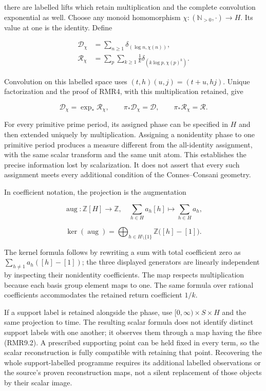 there are labelled lifts which retain multiplication and the complete
convolution exponential as well. Choose any monoid homomorphism
\(\chi:(\mathbb N_{>0},\cdot)\to H\). Its value at one is the identity.
Define

\[
\begin{aligned}
\mathcal D_\chi&=\sum_{n\ge1}\delta_{(\log n,\chi(n))},\\
\mathcal R_\chi&=\sum_p\sum_{k\ge1}\frac1k
\delta_{(k\log p,\chi(p)^k)}.
\end{aligned}
\tag{RMR9.3}
\]

Convolution on this labelled space uses \((t,h)(u,j)=(t+u,hj)\). Unique
factorization and the proof of RMR4, with this multiplication retained,
give

\[
\mathcal D_\chi=\exp_*\mathcal R_\chi,
\qquad
\pi_*\mathcal D_\chi=\mathcal D,
\qquad
\pi_*\mathcal R_\chi=\mathcal R.
\tag{RMR9.4}
\]

For every primitive prime period, its assigned phase can be specified in
\(H\) and then extended uniquely by multiplication. Assigning a
nonidentity phase to one primitive period produces a measure different
from the all-identity assignment, with the same scalar transform and the
same unit atom. This establishes the precise information lost by
scalarization. It does not assert that every such assignment meets every
additional condition of the Connes--Consani geometry.

In coefficient notation, the projection is the augmentation

\[
\operatorname{aug}:\mathbb Z[H]\longrightarrow\mathbb Z,
\quad\sum_{h\in H}a_h[h]\longmapsto\sum_{h\in H}a_h,
\]

\[
\ker(\operatorname{aug})
=\bigoplus_{h\in H\setminus\{1\}}\mathbb Z\bigl([h]-[1]\bigr).
\tag{RMR9.5}
\]

The kernel formula follows by rewriting a sum with total coefficient
zero as \(\sum_{h\ne1}a_h([h]-[1])\); the three displayed generators are
linearly independent by inspecting their nonidentity coefficients. The
map respects multiplication because each basis group element maps to
one. The same formula over rational coefficients accommodates the
retained return coefficient \(1/k\).

If a support label is retained alongside the phase, use
\([0,\infty)\times S\times H\) and the same projection to time. The
resulting scalar formula does not identify distinct support labels with
one another; it observes them through a map having the fibre (RMR9.2). A
prescribed supporting point can be held fixed in every term, so the
scalar reconstruction is fully compatible with retaining that point.
Recovering the whole support-labelled programme requires its additional
labelled observations or the source's proven reconstruction maps, not a
silent replacement of those objects by their scalar image.

